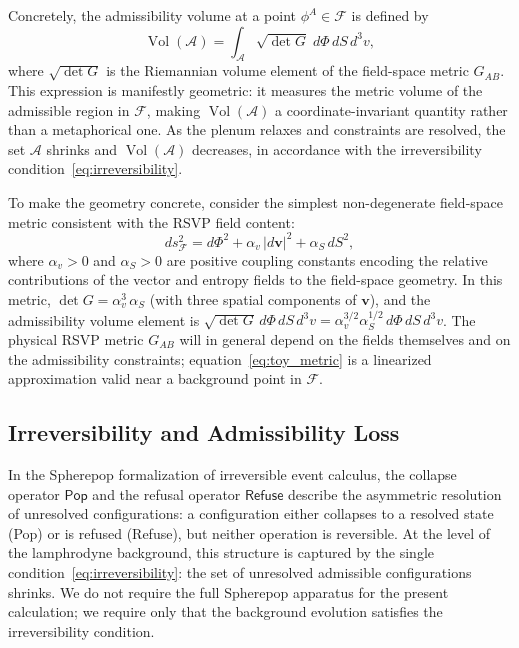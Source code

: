\documentclass[12pt, a4paper]{article}
\newcommand{\vv}{\mathbf{v}}
\newcommand{\calA}{\mathcal{A}}
\newcommand{\calF}{\mathcal{F}}
\newcommand{\Vol}{\operatorname{Vol}}
\begin{document}
Concretely, the admissibility volume at a point $\phi^A \in \calF$ is defined by
\begin{equation}
\Vol(\calA) = \int_{\calA} \sqrt{\det G}\; d\Phi\, dS\, d^3v,
\end{equation}
where $\sqrt{\det G}$ is the Riemannian volume element of the field-space metric
$G_{AB}$. This expression is manifestly geometric: it measures the metric volume of
the admissible region in $\calF$, making $\Vol(\calA)$ a coordinate-invariant
quantity rather than a metaphorical one. As the plenum relaxes and constraints are
resolved, the set $\calA$ shrinks and $\Vol(\calA)$ decreases, in accordance with
the irreversibility condition~\eqref{eq:irreversibility}.

To make the geometry concrete, consider the simplest non-degenerate field-space
metric consistent with the RSVP field content:
\begin{equation}
ds^2_{\calF} = d\Phi^2 + \alpha_v\,|d\vv|^2 + \alpha_S\,dS^2,
\label{eq:toy_metric}
\end{equation}
where $\alpha_v > 0$ and $\alpha_S > 0$ are positive coupling constants encoding
the relative contributions of the vector and entropy fields to the field-space
geometry. In this metric, $\det G = \alpha_v^3\,\alpha_S$ (with three spatial
components of $\vv$), and the admissibility volume element is
$\sqrt{\det G}\,d\Phi\,dS\,d^3v = \alpha_v^{3/2}\alpha_S^{1/2}\,d\Phi\,dS\,d^3v$.
The physical RSVP metric $G_{AB}$ will in general depend on the fields themselves
and on the admissibility constraints; equation~\eqref{eq:toy_metric} is a
linearized approximation valid near a background point in $\calF$.

\subsection{Irreversibility and Admissibility Loss}
\label{sec:irreversibility}

In the Spherepop formalization of irreversible event calculus, the collapse operator
$\mathsf{Pop}$ and the refusal operator $\mathsf{Refuse}$ describe the asymmetric
resolution of unresolved configurations: a configuration either collapses to a
resolved state (Pop) or is refused (Refuse), but neither operation is reversible.
At the level of the lamphrodyne background, this structure is captured by the
single condition~\eqref{eq:irreversibility}: the set of unresolved admissible
configurations shrinks. We do not require the full Spherepop apparatus for the
present calculation; we require only that the background evolution satisfies the
irreversibility condition.
\end{document}
